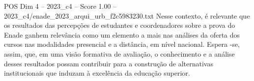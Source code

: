 \begin{textsample}{POS Dim 4 – 2023\_c4 – Score 1.00 – 2023\_c4/enade\_2023\_arqui\_urb\_f2c5983230.txt}
Nesse contexto, é relevante que os resultados das percepções de estudantes e coordenadores sobre a prova do Enade ganhem relevância como um elemento a mais nas análises da oferta dos cursos nas modalidades presencial e a distância, em nível nacional.
Espera -se, assim, que, em uma visão formativa de avaliação, o conhecimento e a análise desses resultados possam contribuir para a construção de alternativas institucionais que induzam à excelência da educação superior.

\end{textsample}

